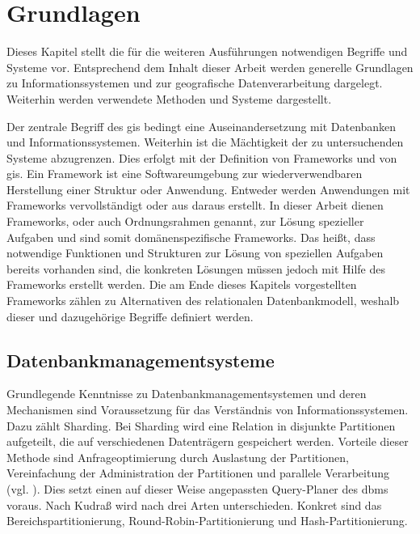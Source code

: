 \chapter{Grundlagen}
\label{Grundlagen}

Dieses Kapitel stellt die für die weiteren Ausführungen notwendigen Begriffe und Systeme vor.
Entsprechend dem Inhalt dieser Arbeit werden generelle Grundlagen zu Informationssystemen und zur geografische Datenverarbeitung dargelegt.
Weiterhin werden verwendete Methoden und Systeme dargestellt.

Der zentrale Begriff des \Gls{gis} bedingt eine Auseinandersetzung mit Datenbanken und Informationssystemen.
Weiterhin ist die Mächtigkeit der zu untersuchenden Systeme abzugrenzen.
Dies erfolgt mit der Definition von Frameworks und von \Gls{gis}.
Ein Framework ist eine Softwareumgebung zur wiederverwendbaren Herstellung einer Struktur oder Anwendung.
Entweder werden Anwendungen mit Frameworks vervollständigt oder aus daraus erstellt.
In dieser Arbeit dienen Frameworks, oder auch Ordnungsrahmen genannt, zur Lösung spezieller Aufgaben und sind somit domänenspezifische Frameworks.
Das heißt, dass notwendige Funktionen und Strukturen zur Lösung von speziellen Aufgaben bereits vorhanden sind, die konkreten Lösungen müssen jedoch mit Hilfe des Frameworks erstellt werden.
Die am Ende dieses Kapitels vorgestellten Frameworks zählen zu Alternativen des relationalen Datenbankmodell, weshalb dieser und dazugehörige Begriffe definiert werden.

\section{Datenbankmanagementsysteme}

Grundlegende Kenntnisse zu Datenbankmanagementsystemen und deren Mechanismen sind Voraussetzung für das Verständnis von Informationssystemen.
Dazu zählt Sharding.
Bei Sharding wird eine Relation in disjunkte Partitionen aufgeteilt, die auf verschiedenen Datenträgern gespeichert werden.
Vorteile dieser Methode sind Anfrageoptimierung durch Auslastung der Partitionen, Vereinfachung der Administration der Partitionen und parallele Verarbeitung (vgl. \cite[S.296]{book:kudrass}).
Dies setzt einen auf dieser Weise angepassten Query-Planer des \Gls{dbms} voraus.
Nach Kudraß wird nach drei Arten unterschieden.
Konkret sind das Bereichspartitionierung, Round-Robin-Partitionierung und Hash-Partitionierung.

